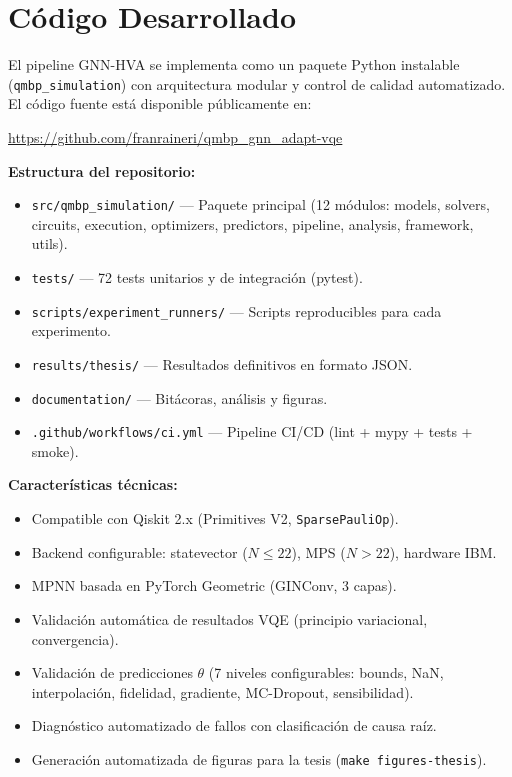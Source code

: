 \documentclass[11pt,a4paper,spanish]{book}
\begin{document}
\section{Código Desarrollado}
\label{sec:codigo}

El pipeline GNN-HVA se implementa como un paquete Python instalable (\texttt{qmbp\_simulation}) con arquitectura modular y control de calidad automatizado. El código fuente está disponible públicamente en:

\begin{center}
\url{https://github.com/franraineri/qmbp_gnn_adapt-vqe}
\end{center}

\textbf{Estructura del repositorio:}
\begin{itemize}
    \item \texttt{src/qmbp\_simulation/} --- Paquete principal (12 módulos: models, solvers, circuits, execution, optimizers, predictors, pipeline, analysis, framework, utils).
    \item \texttt{tests/} --- 72 tests unitarios y de integración (pytest).
    \item \texttt{scripts/experiment\_runners/} --- Scripts reproducibles para cada experimento.
    \item \texttt{results/thesis/} --- Resultados definitivos en formato JSON.
    \item \texttt{documentation/} --- Bitácoras, análisis y figuras.
    \item \texttt{.github/workflows/ci.yml} --- Pipeline CI/CD (lint + mypy + tests + smoke).
\end{itemize}

\textbf{Características técnicas:}
\begin{itemize}
    \item Compatible con Qiskit 2.x (Primitives V2, \texttt{SparsePauliOp}).
    \item Backend configurable: statevector ($N \leq 22$), MPS ($N > 22$), hardware IBM.
    \item MPNN basada en PyTorch Geometric \citep{fey2019} (GINConv, 3 capas).
    \item Validación automática de resultados VQE (principio variacional, convergencia).
    \item Validación de predicciones $\theta$ (7 niveles configurables: bounds, NaN, interpolación, fidelidad, gradiente, MC-Dropout, sensibilidad).
    \item Diagnóstico automatizado de fallos con clasificación de causa raíz.
    \item Generación automatizada de figuras para la tesis (\texttt{make figures-thesis}).
\end{itemize}
\end{document}
